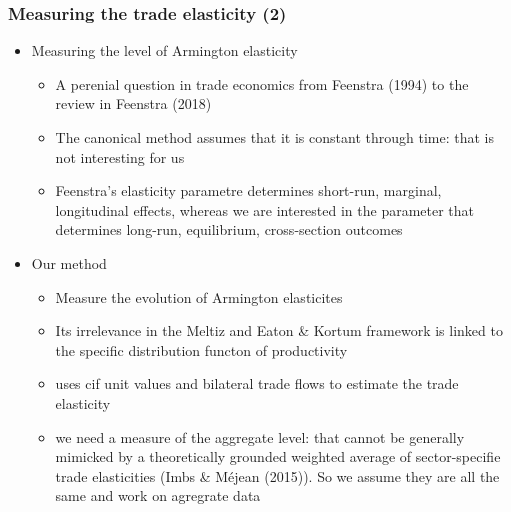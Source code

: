 \documentclass{beamer}
\begin{document}
\begin{frame}\frametitle{Measuring the trade elasticity (2)}	
	\begin{itemize}
		\item Measuring the level of Armington elasticity
		\begin{itemize}
			\item A perenial question in trade economics from Feenstra (1994) to the review in Feenstra (2018)
			\item The canonical method assumes that it is constant through time: that is not interesting for us
			\item Feenstra's elasticity parametre determines short-run, marginal, longitudinal effects, whereas we are interested in the parameter that determines long-run, equilibrium, cross-section outcomes
		\end{itemize}
		\item Our method
		\begin{itemize}
			\item Measure the evolution of Armington elasticites
			\item Its irrelevance in the Meltiz and Eaton \& Kortum framework is linked to the specific distribution functon of productivity 
			\item uses cif unit values and bilateral trade flows to estimate the trade elasticity
			\item we need a measure of the aggregate level: that cannot be generally mimicked by a theoretically grounded weighted average of sector-specifie trade elasticities (Imbs \& Méjean (2015)). So we assume they are all the same and work on agregrate data
		\end{itemize}
	\end{itemize}
\end{frame}	
\end{document}
